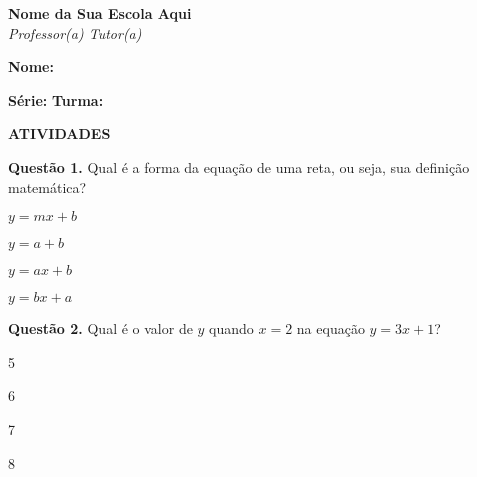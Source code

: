 \documentclass[a4paper,12pt]{article}
\begin{document}
\hspace{-0.6cm} \textbf{Nome da Sua Escola Aqui} \\ 
\vspace{0.1cm}
\textit{Professor(a) Tutor(a)}
\vspace{0.3cm}

\hspace{-0.6cm} \textbf{Nome:} \hrulefill \\
\vspace{-0.2cm}

\hspace{-0.6cm} \textbf{Série:} \makebox[4cm]{\hrulefill} \hspace{0.5cm} \textbf{Turma:} \hrulefill

\vspace{0.5cm}

\begin{center}
    \textbf{ATIVIDADES}
\end{center}


\hspace{-0.4cm} \textbf{Questão 1.} Qual é a forma da equação de uma reta, ou seja, sua definição matemática?

\begin{enumerate}[label=\alph*)]
    \begin{multicols}{2}
        \item $ y = mx + b $
        \item $ y = a + b $
        \item $ y = ax + b $
        \item $ y = bx + a $
    \end{multicols}
\end{enumerate}

\vspace{0.5cm}

\hspace{-0.4cm} \textbf{Questão 2.} Qual é o valor de $y$ quando $x = 2$ na equação $y = 3x + 1$?

\begin{enumerate}[label=\alph*)]
    \begin{multicols}{2}
        \item 5
        \item 6
        \item 7
        \item 8
    \end{multicols}
\end{enumerate}

\vspace{0.5cm}
\end{document}
